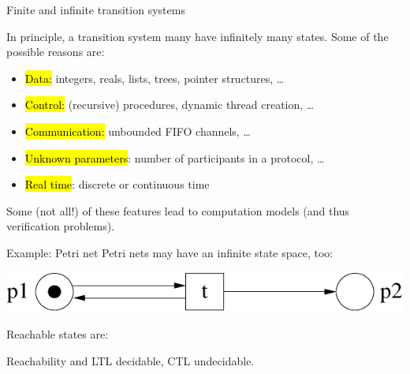 
\begin{frame}{Finite and infinite transition systems}

In principle, a transition system many have infinitely many states.
Some of the possible reasons are:
\bigskip

\begin{itemize}
\item \hl{Data:} integers, reals, lists, trees, pointer structures, \ldots
\item \hl{Control:} (recursive) procedures, dynamic thread creation, \ldots
\item \hl{Communication:} unbounded FIFO channels, \ldots
\item \hl{Unknown parameters}: number of participants in a protocol, \ldots
\item \hl{Real time}: discrete or continuous time
\end{itemize}

\bigskip
 Some (not all!) of these features lead to 
 computation models (and thus 
 verification problems).

\end{frame}


\begin{frame}{Example: Petri net}
Petri nets may have an infinite state space, too:

\bigskip
\begin{center}
{\includegraphics[width=\textwidth]{content/chapter_model_checking/model_checking/images/infinite}}
\end{center}

\bigskip
Reachable states are:

\bigskip
Reachability and LTL decidable, CTL undecidable.

\end{frame}


